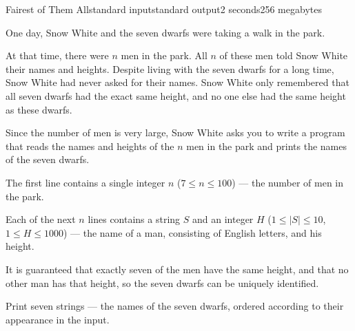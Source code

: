 \begin{problem}{Fairest of Them All}{standard input}{standard output}{2 seconds}{256 megabytes}

One day, Snow White and the seven dwarfs were taking a walk in the park.

At that time, there were $n$ men in the park. 
All $n$ of these men told Snow White their names and heights. 
Despite living with the seven dwarfs for a long time, Snow White had never asked for their names. 
Snow White only remembered that all seven dwarfs had the exact same height, and no one else had the same height as these dwarfs.

Since the number of men is very large, Snow White asks you to write a program that reads the names and heights of the $n$ men in the park and prints the names of the seven dwarfs.

\InputFile
The first line contains a single integer $n$ ($7 \le n \le 100$) --- the number of men in the park.

Each of the next $n$ lines contains a string $S$ and an integer $H$ ($1 \le |S| \le 10$, $1 \le H \le 1000$) --- the name of a man, consisting of English letters, and his height.

It is guaranteed that exactly seven of the men have the same height, and that no other man has that height, so the seven dwarfs can be uniquely identified.


\OutputFile
Print seven strings --- the names of the seven dwarfs, ordered according to their appearance in the input.


\Examples

\begin{example}
%
%
\end{example}

\end{problem}

